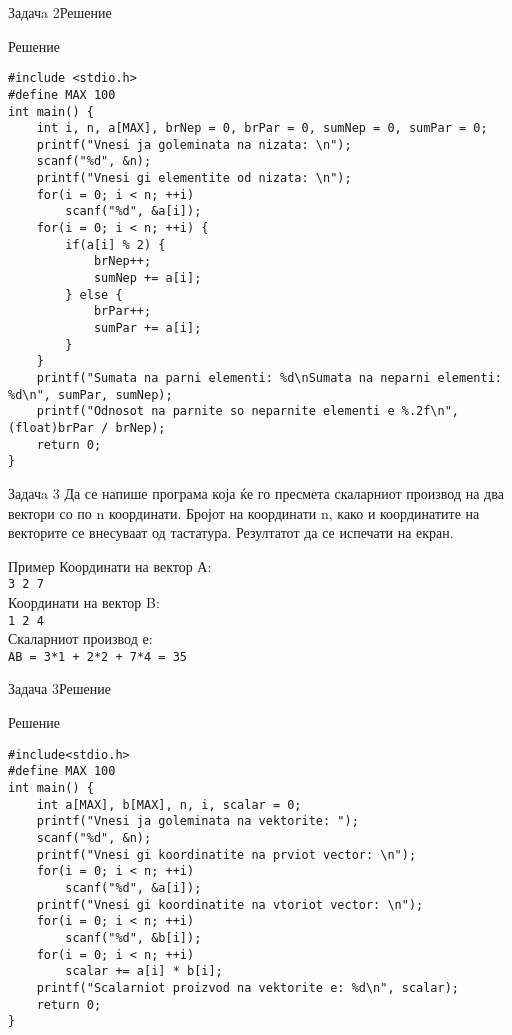 \begin{frame}[fragile]{Задачa 2}{Решение} 
\begin{exampleblock}{Решение}
\begin{lstlisting}
#include <stdio.h>
#define MAX 100
int main() {
    int i, n, a[MAX], brNep = 0, brPar = 0, sumNep = 0, sumPar = 0;
    printf("Vnesi ja goleminata na nizata: \n");
    scanf("%d", &n);
    printf("Vnesi gi elementite od nizata: \n");
    for(i = 0; i < n; ++i)
        scanf("%d", &a[i]);
    for(i = 0; i < n; ++i) {
        if(a[i] % 2) {
            brNep++;
            sumNep += a[i];
        } else {
            brPar++;
            sumPar += a[i];
        }
    }
    printf("Sumata na parni elementi: %d\nSumata na neparni elementi: %d\n", sumPar, sumNep);
    printf("Odnosot na parnite so neparnite elementi e %.2f\n", (float)brPar / brNep);
    return 0;
}
\end{lstlisting}
\end{exampleblock}
\end{frame}

\begin{frame}{Задачa 3}
Да се напише програма која ќе го пресмета скаларниот производ на два вектори со по n координати. Бројот на координати n, како и координатите на векторите се внесуваат од тастатура. Резултатот да се испечати на екран.
\begin{exampleblock}{Пример}
Координати на вектор А:\\
\texttt{3 2 7}\\
Координати на вектор B:\\
\texttt{1 2 4}\\
Скаларниот производ е:\\
\texttt{AB = 3*1 + 2*2 + 7*4 = 35}
\end{exampleblock}
\end{frame}

\begin{frame}[fragile]{Задача 3}{Решение} 
\begin{exampleblock}{Решение}
\begin{lstlisting}
#include<stdio.h>
#define MAX 100
int main() {
    int a[MAX], b[MAX], n, i, scalar = 0;
    printf("Vnesi ja goleminata na vektorite: ");
    scanf("%d", &n);
    printf("Vnesi gi koordinatite na prviot vector: \n");
    for(i = 0; i < n; ++i)
        scanf("%d", &a[i]);
    printf("Vnesi gi koordinatite na vtoriot vector: \n");
    for(i = 0; i < n; ++i)
        scanf("%d", &b[i]);
    for(i = 0; i < n; ++i)
        scalar += a[i] * b[i];
    printf("Scalarniot proizvod na vektorite e: %d\n", scalar);
    return 0;
}
\end{lstlisting}
\end{exampleblock}
\end{frame}

